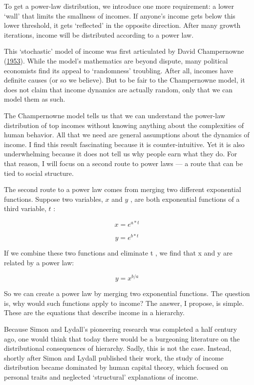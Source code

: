 \documentclass[
]{book}
\begin{document}
To get a power-law distribution, we introduce one more requirement: a lower `wall' that limits the smallness of incomes. If anyone's income gets below this lower threshold, it gets `reflected' in the opposite direction. After many growth iterations, income will be distributed according to a power law.

This `stochastic' model of income was first articulated by David Champernowne (\href{https://economicsfromthetopdown.com/2021/10/24/redistributing-income-through-hierarchy/\#ref-champernowne_model_1953}{1953}). While the model's mathematics are beyond dispute, many political economists find its appeal to `randomness' troubling. After all, incomes have definite causes (or so we believe). But to be fair to the Champernowne model, it does not claim that income dynamics are actually random, only that we can model them as such.

The Champernowne model tells us that we can understand the power-law distribution of top incomes without knowing anything about the complexities of human behavior. All that we need are general assumptions about the dynamics of income. I find this result fascinating because it is counter-intuitive. Yet it is also underwhelming because it does not tell us why people earn what they do. For that reason, I will focus on a second route to power laws --- a route that can be tied to social structure.

The second route to a power law comes from merging two different exponential functions. Suppose two variables, \(x\) and \(y\) , are both exponential functions of a third variable, \(t\) :

\[x = e^{a*t}\]

\[y = e^{b*t}\]

If we combine these two functions and eliminate t , we find that x and y are related by a power law:

\[y = x ^{b/a}\]

So we can create a power law by merging two exponential functions.
The question is, why would such functions apply to income?
The answer, I propose, is simple.
These are the equations that describe income in a hierarchy.

Because Simon and Lydall's pioneering research was completed a half century ago, one would think that today there would be a burgeoning literature on the distributional consequences of hierarchy. Sadly, this is not the case. Instead, shortly after Simon and Lydall published their work, the study of income distribution became dominated by human capital theory, which focused on personal traits and neglected `structural' explanations of income.
\end{document}
